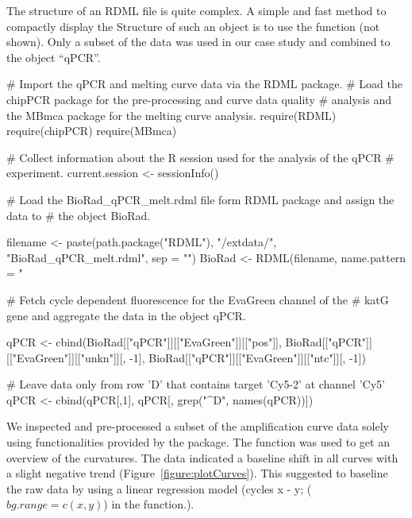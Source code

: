 The structure of an RDML file is quite complex. A simple and fast method to 
compactly display the Structure of such an object is to use the  
function (not shown). Only a subset of the data was used in our case study 
and combined to the object ``qPCR''.

\begin{example}
# Import the qPCR and melting curve data via the RDML package.
# Load the chipPCR package for the pre-processing and curve data quality
# analysis and the MBmca package for the melting curve analysis.
require(RDML)
require(chipPCR)
require(MBmca)

# Collect information about the R session used for the analysis of the qPCR
# experiment.
current.session <- sessionInfo()

# Load the BioRad_qPCR_melt.rdml file form RDML package and assign the data to 
# the object BioRad.

filename <- paste(path.package("RDML"), "/extdata/", 
		  "BioRad_qPCR_melt.rdml", sep = "")
BioRad <- RDML(filename, name.pattern = "%

# Fetch cycle dependent fluorescence for the EvaGreen channel of the 
# katG gene and aggregate the data in the object qPCR.

qPCR <- cbind(BioRad[["qPCR"]][["EvaGreen"]][["pos"]], 
	      BioRad[["qPCR"]][["EvaGreen"]][["unkn"]][, -1], 
	      BioRad[["qPCR"]][["EvaGreen"]][["ntc"]][, -1])
	      
# Leave data only from row 'D' that contains target 'Cy5-2' at channel 'Cy5'
qPCR <- cbind(qPCR[,1], qPCR[, grep("^D", names(qPCR))])
\end{example}

We inspected and pre-processed a subset of the amplification curve data solely 
using functionalities provided by the  package. The 
 function was used to get an overview of the curvatures. The 
data indicated a baseline shift in all curves with a slight negative trend 
(Figure~\ref{figure:plotCurves}). This suggested to baseline the raw data by 
using a linear regression model (cycles x - y; ($bg.range = c(x, y)$) in the 
 function.).

